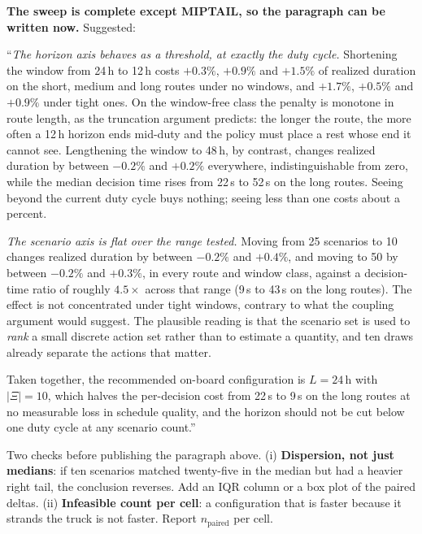 \begin{anew}
\textbf{The sweep is complete except MIPTAIL, so the paragraph can be written
now.} Suggested:

\medskip
``\emph{The horizon axis behaves as a threshold, at exactly the duty cycle.}
Shortening the window from 24\,h to 12\,h costs $+0.3\%$, $+0.9\%$ and $+1.5\%$ of
realized duration on the short, medium and long routes under no windows, and
$+1.7\%$, $+0.5\%$ and $+0.9\%$ under tight ones. On the window-free class the
penalty is monotone in route length, as the truncation argument predicts: the
longer the route, the more often a 12\,h horizon ends mid-duty and the policy must
place a rest whose end it cannot see. Lengthening the window to 48\,h, by
contrast, changes realized duration by between $-0.2\%$ and $+0.2\%$ everywhere,
indistinguishable from zero, while the median decision time rises from 22\,s to
52\,s on the long routes. Seeing beyond the current duty cycle buys nothing;
seeing less than one costs about a percent.

\medskip
\emph{The scenario axis is flat over the range tested.} Moving from 25 scenarios
to 10 changes realized duration by between $-0.2\%$ and $+0.4\%$, and moving to 50
by between $-0.2\%$ and $+0.3\%$, in every route and window class, against a
decision-time ratio of roughly $4.5\times$ across that range (9\,s to 43\,s on the
long routes). The effect is not concentrated under tight windows, contrary to
what the coupling argument would suggest. The plausible reading is that the
scenario set is used to \emph{rank} a small discrete action set rather than to
estimate a quantity, and ten draws already separate the actions that matter.

\medskip
Taken together, the recommended on-board configuration is $L = 24$\,h with
$|\Xi| = 10$, which halves the per-decision cost from 22\,s to 9\,s on the long
routes at no measurable loss in schedule quality, and the horizon should not be
cut below one duty cycle at any scenario count.''
\end{anew}

\begin{atodo}
Two checks before publishing the paragraph above. (i) \textbf{Dispersion, not just
medians}: if ten scenarios matched twenty-five in the median but had a heavier
right tail, the conclusion reverses. Add an IQR column or a box plot of the paired
deltas. (ii) \textbf{Infeasible count per cell}: a configuration that is faster
because it strands the truck is not faster. Report $n_{\text{paired}}$ per cell.
\end{atodo}

